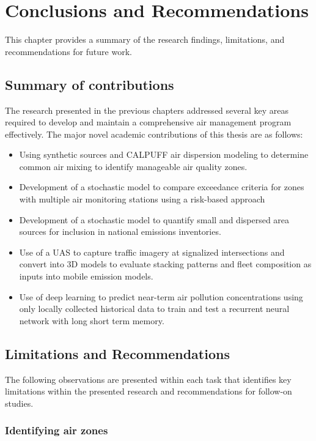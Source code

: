 \chapter{Conclusions and Recommendations}
This chapter provides a summary of the research findings, limitations, and recommendations for future work.

\section{Summary of contributions}

The research presented in the previous chapters addressed several key areas required to develop and maintain a comprehensive air management program effectively. The major novel academic contributions of this thesis are as follows:

\begin{itemize}
\item {Using synthetic sources and CALPUFF air dispersion modeling to determine common air mixing to identify manageable air quality zones.}
\item {Development of a stochastic model to compare exceedance criteria for zones with multiple air monitoring stations using a risk-based approach}
\item{Development of a stochastic model to quantify small and dispersed area sources for inclusion in national emissions inventories.}
\item{Use of a UAS to capture traffic imagery at signalized intersections and convert into 3D models to evaluate stacking patterns and fleet composition as inputs into mobile emission models}.
\item{Use of deep learning to predict near-term air pollution concentrations using only locally collected historical data to train and test a recurrent neural network with long short term memory.}
\end{itemize}


\section{Limitations and Recommendations}

The following observations are presented within each task that identifies key limitations within the presented research and recommendations for follow-on studies.

\noindent
\subsection*{Identifying air zones}

